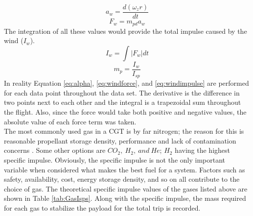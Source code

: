 \begin{equation}\label{eq:alpha}
a_w = \frac{d(\omega_z r)}{dt}
\end{equation}%
%
%
\begin{equation}\label{eq:windforce}
F_w = m_{pd}a_w
\end{equation}%
%
The integration of all these values would provide the total impulse caused by the wind ($I_w$).
\begin{equation}\label{eq:windimpulse}
I_w=\int |F_w| dt
\end{equation}%
\begin{equation}\label{eq:propmass}
m_p=\frac{I_w}{I_{sp}}
\end{equation}
In reality Equation \ref{eq:alpha}, \ref{eq:windforce}, and \ref{eq:windimpulse} are performed for each data point throughout the data set. The derivative is the difference in two points next to each other and the integral is a trapezoidal sum throughout the flight. Also, since the force would take both positive and negative values, the absolute value of each force term was taken.\\
The most commonly used gas in a CGT is by far nitrogen; the reason for this is reasonable  propellant storage density, performance and lack of contamination concerns \cite{thrusteroptions}. Some other options are $CO_2,\ H_2,\ and\ He$; $H_2$ having the highest specific impulse. Obviously, the specific impulse is not the only important variable when considered what makes the best fuel for a system. Factors such as safety, availability, cost, energy storage density, and so on all contribute to the choice of gas. The theoretical specific impulse values of the gases listed above are shown in Table \ref{tab:GasIsps}. Along with the specific impulse, the mass required for each gas to stabilize the payload for the total trip is recorded. 
